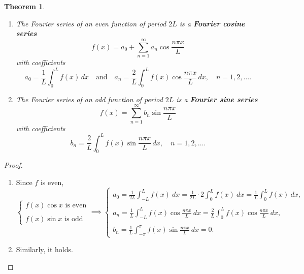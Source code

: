 \documentclass[12pt,openany]{book}
\newtheorem{theorem}{Theorem}[chapter]
\theoremstyle{definition}
\begin{document}
	\begin{tcolorbox}[colframe=thmcolor, title={\color{white}\bf Fourier Cosine and Since Series}]
		\begin{theorem}
			\begin{enumerate}[(1)]
				\item The Fourier series of an even function of period \(2L\) is a \textbf{Fourier cosine series}
				\[
				f(x) = a_0 + \sum_{n=1}^{\infty} a_n \cos \frac{n\pi x}{L}
				\]
				with coefficients
				\[
				a_0 = \frac{1}{L} \int_{0}^{L} f(x) \, dx \quad \text{and} \quad a_n = \frac{2}{L} \int_{0}^{L} f(x) \cos \frac{n\pi x}{L} \, dx, \quad n = 1,2,\ldots .
				\]
				
				\item The Fourier series of an odd function of period \(2L\) is a \textbf{Fourier sine series}
				\[
				f(x) = \sum_{n=1}^{\infty} b_n \sin \frac{n\pi x}{L}
				\]
				with coefficients
				\[
				b_n = \frac{2}{L} \int_{0}^{L} f(x) \sin \frac{n\pi x}{L} \, dx, \quad n = 1,2,\ldots .
				\]
			\end{enumerate}
		\end{theorem}
	\end{tcolorbox}
	\begin{proof}
		\begin{enumerate}[(1)]
			\item Since $f$ is even, \[
				\begin{cases}
					\text{$f(x)\cos x$ is even} \\
					\\ \text{$f(x)\sin x$ is odd}
				\end{cases}\implies\begin{cases}
					\displaystyle a_0=\frac{1}{2L}\int_{-L}^{L}f(x)\ dx=\frac{1}{2L}\cdot 2\int_0^Lf(x)\ dx=\frac{1}{L}\int_0^Lf(x)\ dx,\\
					\\
					\displaystyle a_n=\frac{1}{L}\int_{-L}^{L}f(x)\cos\frac{n\pi x}{L}\ dx=\frac{2}{L}\int_{0}^{L}f(x)\cos\frac{n\pi x}{L}\ dx,\\
					\\
					\displaystyle b_n=\frac{1}{L}\int_{-\pi}^{\pi}f(x)\sin\frac{n\pi x}{L}\ dx=0.
				\end{cases}
				\]
				\item Similarly, it holds.
		\end{enumerate}
	\end{proof}
\end{document}
